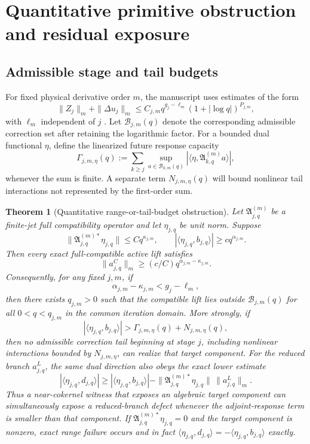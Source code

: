 \documentclass[12pt]{article}
\theoremstyle{plain}
\newtheorem{theorem}{Theorem}[section]
\theoremstyle{definition}
\theoremstyle{remark}
\newcommand{\Comp}{\mathfrak A}
\newcommand{\Budget}{\mathcal B}
\begin{document}
\section{Quantitative primitive obstruction and residual exposure}\label{sec:quant-obstruction}
\subsection{Admissible stage and tail budgets}
For fixed physical derivative order \(m\), the manuscript uses estimates of the form
\[
\|Z_j\|_m+\|\Delta u_j\|_m
\le C_{j,m}q^{g_j-\ell_m}(1+|\log q|)^{P_{j,m}},
\]
with \(\ell_m\) independent of \(j\) \cite[Lemmas~5.4 and 9.8]{OpenAI2026}. Let \(\Budget_{j,m}(q)\) denote the corresponding admissible correction set after retaining the logarithmic factor. For a bounded dual functional \(\eta\), define the linearized future response capacity
\[
\Gamma_{j,m,\eta}(q)
:=\sum_{k\ge j}\sup_{a\in\Budget_{k,m}(q)}
|\langle\eta,\Comp_{k,q}^{(m)}a\rangle|,
\]
whenever the sum is finite. A separate term \(N_{j,m,\eta}(q)\) will bound nonlinear tail interactions not represented by the first-order sum.

\begin{theorem}[Quantitative range-or-tail-budget obstruction]\label{thm:budget}
Let \(\Comp_{j,q}^{(m)}\) be a finite-jet full compatibility operator and let \(\eta_{j,q}\) be unit norm. Suppose
\[
\|\Comp_{j,q}^{(m)*}\eta_{j,q}\|\le Cq^{\kappa_{j,m}},
\qquad
|\langle\eta_{j,q},b_{j,q}\rangle|\ge cq^{\alpha_{j,m}}.
\]
Then every exact full-compatible active lift satisfies
\[
\boxed{\|a^C_{j,q}\|_m\ge(c/C)q^{\alpha_{j,m}-\kappa_{j,m}}.}
\]
Consequently, for any fixed \(j,m\), if
\[
\alpha_{j,m}-\kappa_{j,m}<g_j-\ell_m,
\]
then there exists \(q_{j,m}>0\) such that the compatible lift lies outside \(\Budget_{j,m}(q)\) for all \(0<q<q_{j,m}\) in the common iteration domain. More strongly, if
\[
|\langle\eta_{j,q},b_{j,q}\rangle|
>\Gamma_{j,m,\eta}(q)+N_{j,m,\eta}(q),
\]
then no admissible correction tail beginning at stage \(j\), including nonlinear interactions bounded by \(N_{j,m,\eta}\), can realize that target component. For the reduced branch \(a^L_{j,q}\), the same dual direction also obeys the exact lower estimate
\[
\boxed{
|\langle\eta_{j,q},d_{j,q}\rangle|
\ge
|\langle\eta_{j,q},b_{j,q}\rangle|
-\|\Comp_{j,q}^{(m)*}\eta_{j,q}\|\,\|a^L_{j,q}\|_m .
}
\]
Thus a near-cokernel witness that exposes an algebraic target component can simultaneously expose a reduced-branch defect whenever the adjoint-response term is smaller than that component. If \(\Comp_{j,q}^{(m)*}\eta_{j,q}=0\) and the target component is nonzero, exact range failure occurs and in fact \(\langle\eta_{j,q},d_{j,q}\rangle=-\langle\eta_{j,q},b_{j,q}\rangle\) exactly.
\end{theorem}
\end{document}
